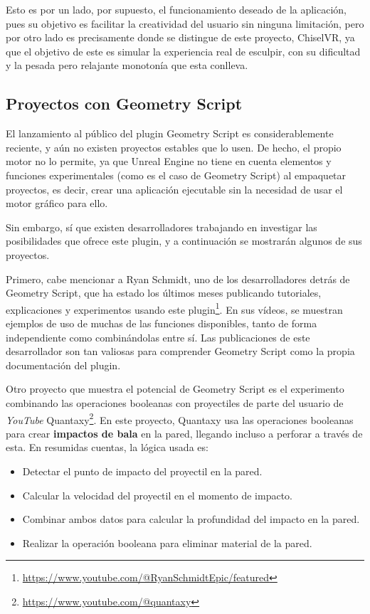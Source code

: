 Esto es por un lado, por supuesto, el funcionamiento deseado de la aplicación, pues su objetivo es facilitar la creatividad del usuario sin ninguna limitación, pero por otro lado es precisamente donde se distingue de este proyecto, ChiselVR, ya que el objetivo de este es simular la experiencia real de esculpir, con su dificultad y la pesada pero relajante monotonía que esta conlleva.

\subsection{Proyectos con Geometry Script}

El lanzamiento al público del plugin Geometry Script es considerablemente reciente, y aún no existen proyectos estables que lo usen. De hecho, el propio motor no lo permite, ya que Unreal Engine no tiene en cuenta elementos y funciones experimentales (como es el caso de Geometry Script) al empaquetar proyectos, es decir, crear una aplicación ejecutable sin la necesidad de usar el motor gráfico para ello.

Sin embargo, sí que existen desarrolladores trabajando en investigar las posibilidades que ofrece este plugin, y a continuación se mostrarán algunos de sus proyectos.

Primero, cabe mencionar a Ryan Schmidt, uno de los desarrolladores detrás de Geometry Script, que ha estado los últimos meses publicando tutoriales, explicaciones y experimentos usando este plugin\footnote{\url{https://www.youtube.com/@RyanSchmidtEpic/featured}}. En sus vídeos, se muestran ejemplos de uso de muchas de las funciones disponibles, tanto de forma independiente como combinándolas entre sí. Las publicaciones de este desarrollador son tan valiosas para comprender Geometry Script como la propia documentación del plugin.

Otro proyecto que muestra el potencial de Geometry Script es el experimento combinando las operaciones booleanas con proyectiles de parte del usuario de \textit{YouTube} Quantaxy\footnote{\url{https://www.youtube.com/@quantaxy}}. En este proyecto, Quantaxy usa las operaciones booleanas para crear \textbf{impactos de bala} en la pared, llegando incluso a perforar a través de esta. En resumidas cuentas, la lógica usada es:

\begin{itemize}
	\item Detectar el punto de impacto del proyectil en la pared.
	\item Calcular la velocidad del proyectil en el momento de impacto.
	\item Combinar ambos datos para calcular la profundidad del impacto en la pared.
	\item Realizar la operación booleana para eliminar material de la pared.
\end{itemize}

